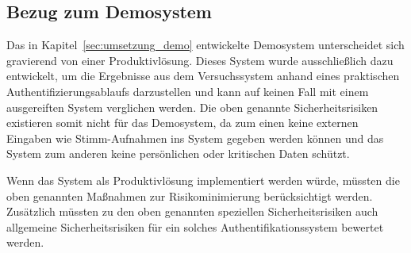 
\subsection{Bezug zum Demosystem}

Das in Kapitel~\ref{sec:umsetzung_demo} entwickelte Demosystem unterscheidet sich gravierend von einer Produktivlösung.
Dieses System wurde ausschließlich dazu entwickelt, um die Ergebnisse aus dem Versuchssystem anhand eines praktischen Authentifizierungsablaufs darzustellen und kann auf keinen Fall mit einem ausgereiften System verglichen werden.
Die oben genannte Sicherheitsrisiken existieren somit nicht für das Demosystem, da zum einen keine externen Eingaben wie Stimm-Aufnahmen ins System gegeben werden können und das System zum anderen keine persönlichen oder kritischen Daten schützt.

Wenn das System als Produktivlösung implementiert werden würde, müssten die oben genannten Maßnahmen zur Risikominimierung berücksichtigt werden.
Zusätzlich müssten zu den oben genannten speziellen Sicherheitsrisiken auch allgemeine Sicherheitsrisiken für ein solches Authentifikationssystem bewertet werden.


\textauthor{\vLB}{}{}

